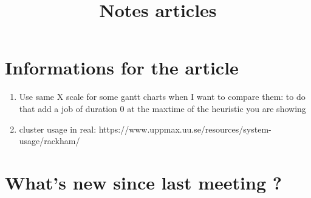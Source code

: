 \documentclass[a4paper]{article}
\title{Notes articles}
\begin{document}
\newpage


\section{Informations for the article}
	\begin{enumerate}
		\item Use same X scale for some gantt charts when I want to compare them: to do that add a job of duration 0 at the maxtime of the heuristic you are showing
		\item cluster usage in real: https://www.uppmax.uu.se/resources/system-usage/rackham/
	 \end{enumerate}

\section{What's new since last meeting ?}
\end{document}
